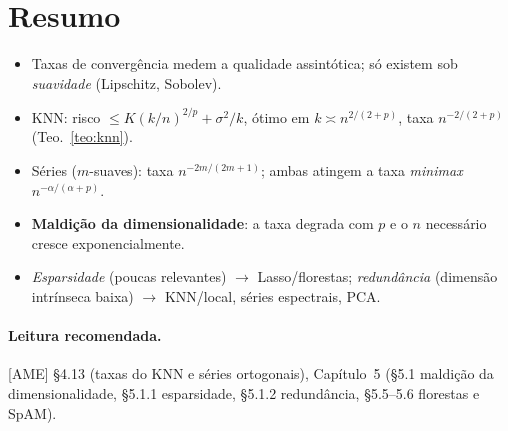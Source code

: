 \documentclass[11pt,a4paper]{article}
\begin{document}
\section*{Resumo}
\begin{itemize}[leftmargin=1.4cm]
  \item Taxas de convergência medem a qualidade assintótica; só existem sob
        \emph{suavidade} (Lipschitz, Sobolev).
  \item KNN: risco $\le K(k/n)^{2/p}+\sigma^2/k$, ótimo em
        $k\asymp n^{2/(2+p)}$, taxa $n^{-2/(2+p)}$ (Teo.~\ref{teo:knn}).
  \item Séries ($m$-suaves): taxa $n^{-2m/(2m+1)}$; ambas atingem a taxa
        \emph{minimax} $n^{-\alpha/(\alpha+p)}$.
  \item \textbf{Maldição da dimensionalidade}: a taxa degrada com $p$ e o $n$
        necessário cresce exponencialmente.
  \item \emph{Esparsidade} (poucas relevantes) $\to$ Lasso/florestas;
        \emph{redundância} (dimensão intrínseca baixa) $\to$ KNN/local, séries
        espectrais, PCA.
\end{itemize}

\paragraph{Leitura recomendada.} [AME] §4.13 (taxas do KNN e séries ortogonais),
Capítulo~5 (§5.1 maldição da dimensionalidade, §5.1.1 esparsidade, §5.1.2
redundância, §5.5--5.6 florestas e SpAM).
\end{document}
